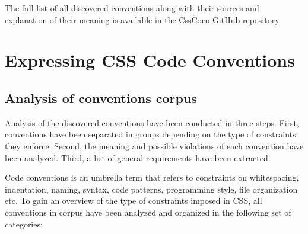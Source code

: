 \documentclass[parskip=full]{uvamscse}
\begin{document}
The full list of all discovered conventions along with their sources and explanation of their meaning is available in the \href{https://github.com/boryanagoncharenko/CssCoco/blob/master/analysis.md}{CssCoco GitHub repository}.


\chapter{Expressing CSS Code Conventions}

\section{Analysis of conventions corpus}

Analysis of the discovered conventions have been conducted in three steps. First, conventions have
been separated in groups depending on the type of constraints they enforce. Second, the meaning and
possible violations of each convention have been analyzed. Third, a list of general requirements
have been extracted.

Code conventions is an umbrella term that refers to constraints on whitespacing, indentation, naming, syntax, code patterns, programming style, file organization etc. To gain an overview of the type of constraints imposed in CSS, all conventions in corpus have been analyzed and organized in the following set of categories:
\end{document}
